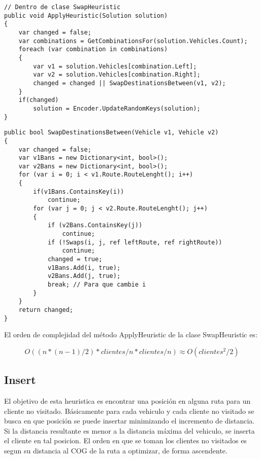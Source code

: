 \bigskip

\begin{minipage}{\textwidth}
\begin{lstlisting}
// Dentro de clase SwapHeuristic
public void ApplyHeuristic(Solution solution)
{
	var changed = false;
	var combinations = GetCombinationsFor(solution.Vehicles.Count);
	foreach (var combination in combinations)
	{
		var v1 = solution.Vehicles[combination.Left];
		var v2 = solution.Vehicles[combination.Right];
		changed = changed || SwapDestinationsBetween(v1, v2);
	}
	if(changed)
		solution = Encoder.UpdateRandomKeys(solution);
}
\end{lstlisting}
\end{minipage}

\begin{minipage}{\textwidth}
\begin{lstlisting}
public bool SwapDestinationsBetween(Vehicle v1, Vehicle v2)
{
	var changed = false;
	var v1Bans = new Dictionary<int, bool>();
	var v2Bans = new Dictionary<int, bool>();
	for (var i = 0; i < v1.Route.RouteLenght(); i++)
	{
		if(v1Bans.ContainsKey(i)) 
			continue;
		for (var j = 0; j < v2.Route.RouteLenght(); j++)
		{
			if (v2Bans.ContainsKey(j)) 
				continue;
			if (!Swaps(i, j, ref leftRoute, ref rightRoute)) 
				continue;
			changed = true;
			v1Bans.Add(i, true);
			v2Bans.Add(j, true);
			break; // Para que cambie i
		}
	}
	return changed;
}
\end{lstlisting}
\end{minipage}

\bigskip

El orden de complejidad del método ApplyHeuristic de la clase SwapHeuristic es:

\begin{equation*}
O((n * (n-1) / 2 ) * clientes/n * clientes/n) \approx O(clientes^2/2)
\end{equation*}

\subsection{Insert}

El objetivo de esta heuristica es encontrar una posición en alguna ruta para un cliente no visitado. Básicamente para cada vehiculo y cada cliente no visitado se busca en que posición se puede insertar minimizando el incremento de distancia. Si la distancia resultante es menor a la distancia máxima del vehiculo, se inserta el cliente en tal posicion. El orden en que se toman los clientes no visitados es segun su distancia al COG de la ruta a optimizar, de forma ascendente.

